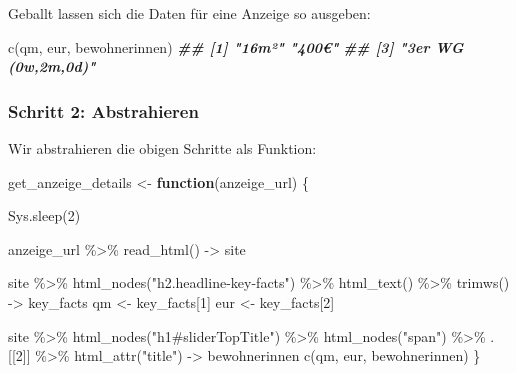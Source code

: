 \documentclass[
  ngerman,
]{article}
\newenvironment{Shaded}{\begin{snugshade}}{\end{snugshade}}
\newcommand{\ControlFlowTok}[1]{\textcolor[rgb]{0.13,0.29,0.53}{\textbf{#1}}}
\newcommand{\DecValTok}[1]{\textcolor[rgb]{0.00,0.00,0.81}{#1}}
\newcommand{\DocumentationTok}[1]{\textcolor[rgb]{0.56,0.35,0.01}{\textbf{\textit{#1}}}}
\newcommand{\FunctionTok}[1]{\textcolor[rgb]{0.00,0.00,0.00}{#1}}
\newcommand{\NormalTok}[1]{#1}
\newcommand{\OtherTok}[1]{\textcolor[rgb]{0.56,0.35,0.01}{#1}}
\newcommand{\SpecialCharTok}[1]{\textcolor[rgb]{0.00,0.00,0.00}{#1}}
\newcommand{\StringTok}[1]{\textcolor[rgb]{0.31,0.60,0.02}{#1}}
\begin{document}
Geballt lassen sich die Daten für eine Anzeige so ausgeben:

\begin{Shaded}
\begin{Highlighting}[]
\FunctionTok{c}\NormalTok{(qm, eur, bewohnerinnen)}
\DocumentationTok{\#\# [1] "16m²"              "400€"             }
\DocumentationTok{\#\# [3] "3er WG (0w,2m,0d)"}
\end{Highlighting}
\end{Shaded}

\hypertarget{schritt-2-abstrahieren-1}{%
\subsubsection{Schritt 2: Abstrahieren}\label{schritt-2-abstrahieren-1}}

Wir abstrahieren die obigen Schritte als Funktion:

\begin{Shaded}
\begin{Highlighting}[]
\NormalTok{get\_anzeige\_details }\OtherTok{\textless{}{-}} \ControlFlowTok{function}\NormalTok{(anzeige\_url) \{}

  \FunctionTok{Sys.sleep}\NormalTok{(}\DecValTok{2}\NormalTok{)}

\NormalTok{  anzeige\_url }\SpecialCharTok{\%\textgreater{}\%}
    \FunctionTok{read\_html}\NormalTok{() }\OtherTok{{-}\textgreater{}}\NormalTok{ site}

\NormalTok{  site }\SpecialCharTok{\%\textgreater{}\%}
    \FunctionTok{html\_nodes}\NormalTok{(}\StringTok{"h2.headline{-}key{-}facts"}\NormalTok{) }\SpecialCharTok{\%\textgreater{}\%}
    \FunctionTok{html\_text}\NormalTok{() }\SpecialCharTok{\%\textgreater{}\%}
    \FunctionTok{trimws}\NormalTok{() }\OtherTok{{-}\textgreater{}}\NormalTok{ key\_facts}
\NormalTok{    qm }\OtherTok{\textless{}{-}}\NormalTok{ key\_facts[}\DecValTok{1}\NormalTok{]}
\NormalTok{    eur }\OtherTok{\textless{}{-}}\NormalTok{ key\_facts[}\DecValTok{2}\NormalTok{]}

\NormalTok{  site }\SpecialCharTok{\%\textgreater{}\%}
    \FunctionTok{html\_nodes}\NormalTok{(}\StringTok{"h1\#sliderTopTitle"}\NormalTok{) }\SpecialCharTok{\%\textgreater{}\%}
    \FunctionTok{html\_nodes}\NormalTok{(}\StringTok{"span"}\NormalTok{) }\SpecialCharTok{\%\textgreater{}\%}
\NormalTok{    .[[}\DecValTok{2}\NormalTok{]] }\SpecialCharTok{\%\textgreater{}\%}
    \FunctionTok{html\_attr}\NormalTok{(}\StringTok{"title"}\NormalTok{) }\OtherTok{{-}\textgreater{}}\NormalTok{ bewohnerinnen}
  \FunctionTok{c}\NormalTok{(qm, eur, bewohnerinnen)}
\NormalTok{\}}
\end{Highlighting}
\end{Shaded}
\end{document}
